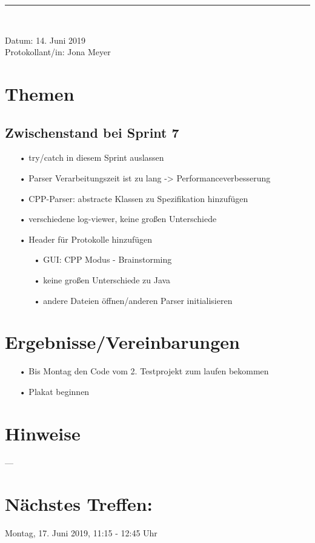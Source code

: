\pagebreak
\begin{center}  
	\vspace{0.5pt}\nointerlineskip\rule{\textwidth}{0.2pt}\\ 
	\vspace{0.5pt}\nointerlineskip
\end{center} 
\large Datum: 14. Juni 2019\vspace{3pt}\\\large Protokollant/in: Jona Meyer
\section*{Themen}
\subsection*{Zwischenstand bei Sprint 7}
\begin{itemize}
\item[•] try/catch in diesem Sprint auslassen
\item[•] Parser Verarbeitungszeit ist zu lang -> Performanceverbesserung 
\item[•] CPP-Parser: abstracte Klassen zu Spezifikation hinzufügen
\item[•] verschiedene log-viewer, keine großen Unterschiede
\item[•] Header für Protokolle hinzufügen
\begin{itemize}
\item[•] GUI: CPP Modus - Brainstorming
\item[•] keine großen Unterschiede zu Java
\item[•] andere Dateien öffnen/anderen Parser initialisieren
\end{itemize}
\end{itemize}

\section*{Ergebnisse/Vereinbarungen}
\begin{itemize}
\item[•] Bis Montag den Code vom 2. Testprojekt zum laufen bekommen
\item[•] Plakat beginnen
\end{itemize}
\section*{Hinweise}
---
\section*{Nächstes Treffen:}
Montag, 17. Juni 2019, 11:15 - 12:45 Uhr